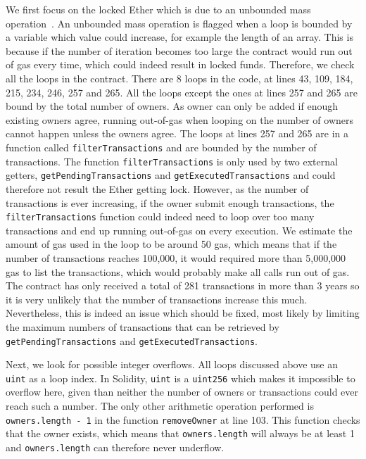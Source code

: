 We first focus on the locked Ether which is due to an unbounded mass operation~\cite{Grech2018}. An unbounded mass operation is flagged when a loop is bounded by a variable which value could increase, for example the length of an array. This is because if the number of iteration becomes too large the contract would run out of gas every time, which could indeed result in locked funds. Therefore, we check all the loops in the contract. There are 8 loops in the code, at lines 43, 109, 184, 215, 234, 246, 257 and 265. All the loops except the ones at lines 257 and 265 are bound by the total number of owners. As owner can only be added if enough existing owners agree, running out-of-gas when looping on the number of owners cannot happen unless the owners agree. The loops at lines 257 and 265 are in a function called \lstinline{filterTransactions} and are bounded by the number of transactions. The function \lstinline{filterTransactions} is only used by two external getters, \lstinline{getPendingTransactions} and \lstinline{getExecutedTransactions} and could therefore not result the Ether getting lock. However, as the number of transactions is ever increasing, if the owner submit enough transactions, the \lstinline{filterTransactions} function could indeed need to loop over too many transactions and end up running out-of-gas on every execution. We estimate the amount of gas used in the loop to be around 50 gas, which means that if the number of transactions reaches 100,000, it would required more than 5,000,000 gas to list the transactions, which would probably make all calls run out of gas. The contract has only received a total of 281 transactions in more than 3 years so it is very unlikely that the number of transactions increase this much. Nevertheless, this is indeed an issue which should be fixed, most likely by limiting the maximum numbers of transactions that can be retrieved by \lstinline{getPendingTransactions} and \lstinline{getExecutedTransactions}.

Next, we look for possible integer overflows. All loops discussed above use an \lstinline{uint} as a loop index. In Solidity, \lstinline{uint} is a \lstinline{uint256} which makes it impossible to overflow here, given than neither the number of owners or transactions could ever reach such a number. The only other arithmetic operation performed is \lstinline{owners.length - 1} in the function \lstinline{removeOwner} at line 103. This function checks that the owner exists, which means that \lstinline{owners.length} will always be at least 1 and \lstinline{owners.length} can therefore never underflow.

